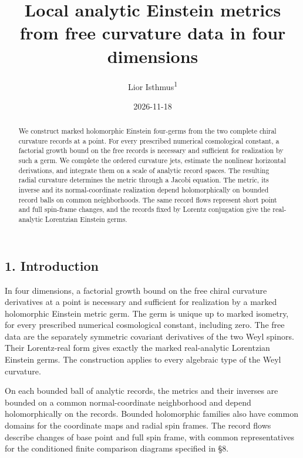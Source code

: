 \documentclass[
  english,
  11pt,
  reqno]{amsart}
\title{Local analytic Einstein metrics from free curvature data in four
dimensions}
\author{Lior Isthmus\textsuperscript{1}}
\date{2026-11-18}
\begin{document}
\raggedbottom
\begin{abstract}
We construct marked holomorphic Einstein four-germs from the two
complete chiral curvature records at a point. For every prescribed
numerical cosmological constant, a factorial growth bound on the free
records is necessary and sufficient for realization by such a germ. We
complete the ordered curvature jets, estimate the nonlinear horizontal
derivations, and integrate them on a scale of analytic record spaces.
The resulting radial curvature determines the metric through a Jacobi
equation. The metric, its inverse and its normal-coordinate realization
depend holomorphically on bounded record balls on common neighborhoods.
The same record flows represent short point and full spin-frame changes,
and the records fixed by Lorentz conjugation give the real-analytic
Lorentzian Einstein germs.
\end{abstract}
\maketitle



\protect{}\label{sec:es-abstract}

\tableofcontents

\setcounter{footnote}{1}

\protect{}\label{sec:es-introduction}

\subsection{1. Introduction}\label{introduction}

In four dimensions, a factorial growth bound on the free chiral
curvature derivatives at a point is necessary and sufficient for
realization by a marked holomorphic Einstein metric germ. The germ is
unique up to marked isometry, for every prescribed numerical
cosmological constant, including zero. The free data are the separately
symmetric covariant derivatives of the two Weyl spinors. Their
Lorentz-real form gives exactly the marked real-analytic Lorentzian
Einstein germs. The construction applies to every algebraic type of the
Weyl curvature.

On each bounded ball of analytic records, the metrics and their inverses
are bounded on a common normal-coordinate neighborhood and depend
holomorphically on the records. Bounded holomorphic families also have
common domains for the coordinate maps and radial spin frames. The
record flows describe changes of base point and full spin frame, with
common representatives for the conditioned finite comparison diagrams
specified in §8.
\end{document}
